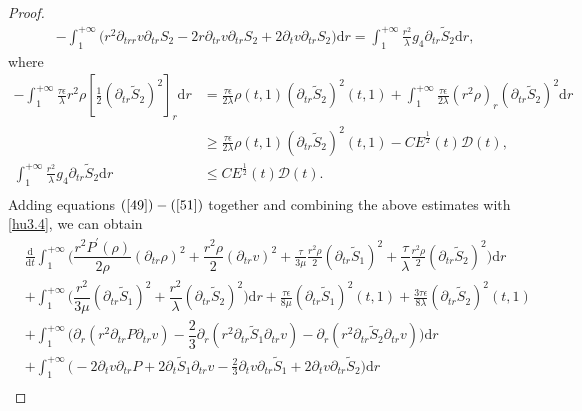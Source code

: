 \documentclass[10pt,reqno]{amsart}
\numberwithin{equation}{section}
\begin{document}
\begin{proof}
\begin{equation}
\begin{aligned}
				&-\int_{1}^{+\infty}\bigg(r^2\partial_{trr}v\partial_{tr}{S_2}
				-2r\partial_{tr}v\partial_{tr}{S_2}
				+2\partial_tv\partial_{tr}{S_2}\bigg)\mathrm{d}r
				=\int_{1}^{+\infty}\frac{r^2}{\lambda}g_4\partial_{tr} \tilde{S}_2\mathrm{d}r
				,
			\end{aligned}
		\end{equation}
		where
		\begin{equation}\nonumber
			\begin{aligned}
				-\int_{1}^{+\infty}
				\frac{\tau\epsilon}{\lambda}r^2\rho[\frac{1}{2}(\partial_{tr}\tilde{S}_2)^2]_r\mathrm{d}r
				&=\frac{\tau\epsilon}{2\lambda}\rho(t,1)(\partial_{tr}\tilde{S}_2)^2(t,1)
				+\int_{1}^{+\infty}
				\frac{\tau\epsilon}{2\lambda}(r^2\rho)_r(\partial_{tr}\tilde{S}_2)^2\mathrm{d}r\\
				&\geq\frac{\tau\epsilon}{2\lambda}\rho(t,1)(\partial_{tr}\tilde{S}_2)^2(t,1) -C E^{\frac{1}{2}}(t) \mathcal{D}(t)
				,\\
				\int_{1}^{+\infty}\frac{r^2}{\lambda}g_4\partial_{tr} \tilde{S}_2\mathrm{d}r
				&\leq C E^{\frac{1}{2}}(t) \mathcal{D}(t).\\
			\end{aligned}
		\end{equation}
		Adding equations $(\ref{49})-(\ref{51})$ together and combining the above estimates with \eqref{hu3.4},  we can obtain
		\begin{equation}\label{52}
			\begin{aligned}
				&\frac{\mathrm{d}}{\mathrm{d} t}\int_{1}^{+\infty}\bigg(\dfrac{r^2 P^{\prime}(\rho)}{2\rho} \left(\partial_{tr} \rho\right)^2 +\dfrac{r^2\rho}{2} (\partial_{tr}v)^2+\frac{\tau}{3 \mu} \frac{r^2 \rho}{2} (\partial_{tr}\tilde{S}_1)^2
				+\dfrac{\tau }{\lambda}\frac{r^2 \rho}{2} (\partial_{tr} \tilde{S}_2)^2\bigg)\mathrm{d}r\\
				&+\int_{1}^{+\infty}\bigg(\dfrac{r^2}{3\mu} (\partial_{tr}\tilde{S}_1)^2
				+\dfrac{r^2}{\lambda}(\partial_{tr}\tilde{S}_2)^2\bigg)\mathrm{d}r
				+\frac{\tau\epsilon}{8\mu} (\partial_{tr}\tilde{S}_1)^2(t,1)
				+\frac{3\tau\epsilon}{8\lambda}(\partial_{tr}\tilde{S}_2)^2(t,1)\\
				&+\int_{1}^{+\infty}\bigg(\partial_{r}\left(r^2\partial_{tr}P\partial_{tr}v\right)-\dfrac{2}{3}\partial_{r}(r^2\partial_{tr}\tilde{S}_1\partial_{tr}v) 
				-\partial_{r}(r^2\partial_{tr}\tilde{S}_2\partial_{tr}v)
				\bigg)\mathrm{d}r\\
				&+\int_{1}^{+\infty}\bigg(-2\partial_{t}v\partial_{tr}P+2\partial_{t}\tilde{S}_1\partial_{tr}v -\frac{2}{3}\partial_{t}v\partial_{tr}\tilde{S}_1+2\partial_{t}v\partial_{tr}\tilde{S}_2\bigg)\mathrm{d}r\\

\end{aligned}
\end{equation}
\end{proof}
\end{document}
